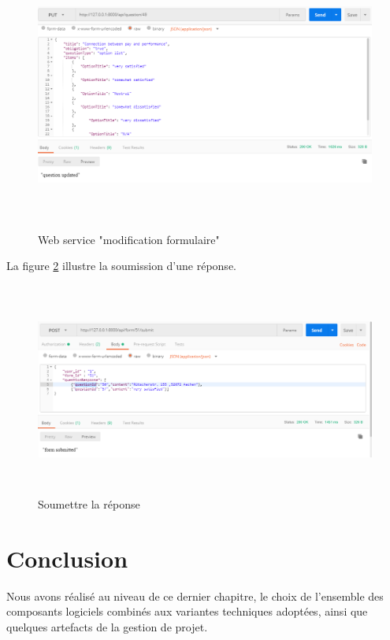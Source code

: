     \begin{figure} [H]
    \centering
         \begin{center}
             \includegraphics [width=16cm,height=9cm] {SprintImage/PutQuestion.PNG}
            \caption{Web service "modification formulaire"}
            \label{SerWeb3}
        \end{center}
    \end{figure}
    \newpage
     La figure \ref{fig5} illustre la soumission d'une réponse.
\begin{figure} [H]
    \centering
         \begin{center}
             \includegraphics [width=16cm,height=7cm] {SprintImage/submitForm.PNG}
            \caption{Soumettre la réponse }
            \label{fig5}
        \end{center}
    \end{figure}

\section{Conclusion}
Nous avons réalisé au niveau de ce dernier chapitre, le choix de l’ensemble des composants logiciels combinés aux variantes techniques adoptées, ainsi que quelques artefacts de la gestion de projet.